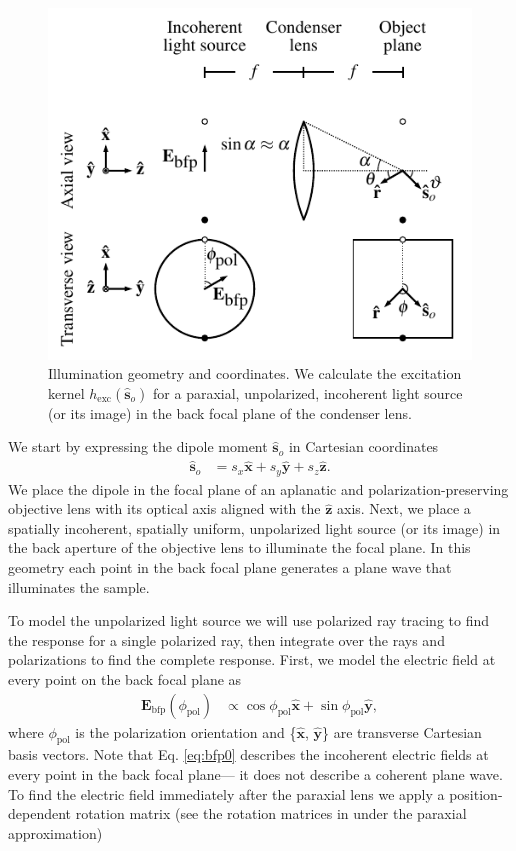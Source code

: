 \documentclass{osa-article}
\providecommand{\mb}[1]{\mathbf{#1}}
\providecommand{\so}{\mathbf{\hat{s}}_o}
\providecommand{\mh}[1]{\mathbf{\hat{#1}}}
\begin{document}
\begin{figure}[h]
 \centering
   \centering
   \includegraphics[scale=.9]{../figures/excitation-coords/excitation-coords.pdf}
   \caption{Illumination geometry and coordinates. We calculate the excitation
     kernel $h_{\text{exc}}(\so)$ for a paraxial, unpolarized, incoherent
     light source (or its image) in the back focal plane of the condenser lens. }
   \label{fig:microscope}
 \end{figure}

We start by expressing the dipole moment $\so{}$ in Cartesian coordinates
\begin{align}
  \so{} &= s_x\mh{x} + s_y\mh{y} + s_z\mh{z}. \label{eq:spherical}
\end{align}
We place the dipole in the focal plane of an aplanatic and
polarization-preserving objective lens with its optical axis aligned with the
$\mh{z}$ axis. Next, we place a spatially incoherent, spatially uniform,
unpolarized light source (or its image) in the back aperture of the objective
lens to illuminate the focal plane. In this geometry each point in the back
focal plane generates a plane wave that illuminates the sample.

To model the unpolarized light source we will use polarized ray tracing
\cite{foreman2011} to find the response for a single polarized ray, then
integrate over the rays and polarizations to find the complete response. First,
we model the electric field at every point on the back focal plane as
\begin{align}
   \mb{E}_{\text{bfp}}(\phi_{\text{pol}}) &\propto \cos\phi_{\text{pol}}\mh{x} + \sin\phi_{\text{pol}}\mh{y}, \label{eq:bfp0}
\end{align}
where $\phi_{\text{pol}}$ is the polarization orientation and \{$\mh{x}$,
$\mh{y}$\} are transverse Cartesian basis vectors. Note that Eq. \ref{eq:bfp0}
describes the incoherent electric fields at every point in the back focal
plane--- it does not describe a coherent plane wave. To find the electric field
immediately after the paraxial lens we apply a position-dependent rotation
matrix (see the rotation matrices in \cite{foreman2011, backer2014} under the
paraxial approximation)
\end{document}
